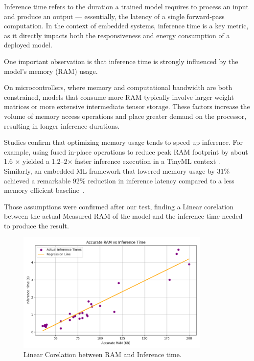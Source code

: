 Inference time refers to the duration a trained model requires to process an input and produce an output — essentially, the latency of a single forward-pass computation. In the context of embedded systems, inference time is a key metric, as it directly impacts both the responsiveness and energy consumption of a deployed model.

One important observation is that inference time is strongly influenced by the model’s memory (RAM) usage. 

On microcontrollers, where memory and computational bandwidth are both constrained, models that consume more RAM typically involve larger weight matrices or more extensive intermediate tensor storage. These factors increase the volume of memory access operations and place greater demand on the processor, resulting in longer inference durations.

Studies confirm that optimizing memory usage tends to speed up inference. For example, using fused in-place operations to reduce peak RAM footprint by about 1.6 × yielded a 1.2–2× faster inference execution in a TinyML context \cite{inferenceTime1}. Similarly, an embedded ML framework that lowered memory usage by 31\% achieved a remarkable 92\% reduction in inference latency compared to a less memory-efficient baseline~\cite{inferenceTime1}.


Those assumptions were confirmed after our test, finding a Linear corelation between the actual Measured RAM of the model and the inference time needed to produce the result.

\begin{figure}[ht]
  \centering
  \includegraphics[width=0.85\textwidth]{Pictures/inference_time_regression_plot.png}
  \caption{Linear Corelation between RAM and Ιnference time.}
  \label{fig:inference time}
\end{figure}





